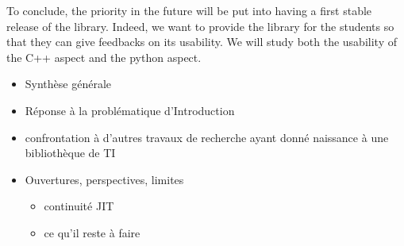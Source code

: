 To conclude, the priority in the future will be put into having a first stable release of the library. Indeed, we want
to provide the library for the students so that they can give feedbacks on its usability. We will study both the
usability of the C++ aspect and the python aspect.


\clearpage


\begin{itemize}
  \item Synthèse générale
  \item Réponse à la problématique d'Introduction
  \item confrontation à d'autres travaux de recherche ayant donné naissance à une bibliothèque de TI
  \item Ouvertures, perspectives, limites
        \begin{itemize}
          \item continuité JIT
          \item ce qu'il reste à faire
        \end{itemize}
\end{itemize}